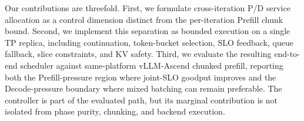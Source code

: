 Our contributions are threefold. First, we formulate cross-iteration P/D
service allocation as a control dimension distinct from the per-iteration
Prefill chunk bound. Second, we implement this separation as bounded
\phasepure{} execution on a single TP replica, including continuation,
token-bucket selection, SLO feedback, queue fallback, slice constraints, and KV
safety. Third, we evaluate the resulting end-to-end scheduler against
same-platform vLLM-Ascend chunked prefill, reporting both the Prefill-pressure
region where joint-SLO goodput improves and the Decode-pressure boundary where
mixed batching can remain preferable. The controller is part of the evaluated
path, but its marginal contribution is not isolated from phase purity, chunking,
and backend execution.
